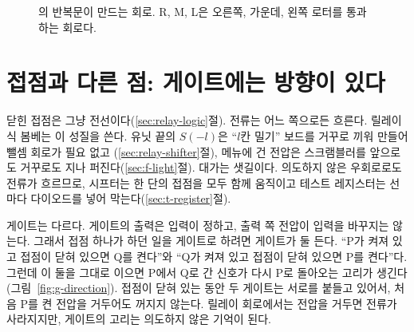 \begin{figure}[ht]
\centering
{}
\caption{의 반복문이 만드는 회로. R, M, L은 오른쪽, 가운데, 왼쪽 로터를 통과하는 회로다.}
\label{fig:g-scr26}
\end{figure}

\section{접점과 다른 점: 게이트에는 방향이 있다}\label{sec:hdl-direction}

\Relay 닫힌 접점은 그냥 전선이다(\ref{sec:relay-logic}절). 전류는 어느 쪽으로든 흐른다. 릴레이식 봄베는 이
성질을 쓴다. 유닛 끝의 $S(-l)$은 ``$l$칸 밀기'' 보드를 거꾸로 끼워 만들어 뺄셈 회로가 필요 없고
(\ref{sec:relay-shifter}절), 메뉴에 건 전압은 스크램블러를 앞으로도 거꾸로도 지나 퍼진다(\ref{sec:f-light}절).
대가는 샛길이다. 의도하지 않은 우회로로도 전류가 흐르므로, 시프터는 한 단의 접점을 모두 함께 움직이고 테스트
레지스터는 선마다 다이오드를 넣어 막는다(\ref{sec:t-register}절).

\Why 게이트는 다르다. 게이트의 출력은 입력이 정하고, 출력 쪽 전압이 입력을 바꾸지는 않는다. 그래서 접점 하나가
하던 일을 게이트로 하려면 게이트가 둘 든다. ``P가 켜져 있고 접점이 닫혀 있으면 Q를 켠다''와 ``Q가 켜져 있고
접점이 닫혀 있으면 P를 켠다''다. 그런데 이 둘을 그대로 이으면 P에서 Q로 간 신호가 다시 P로 돌아오는 고리가
생긴다(그림~\ref{fig:g-direction}). 접점이 닫혀 있는 동안 두 게이트는 서로를 붙들고 있어서, 처음 P를 켠 전압을
거두어도 꺼지지 않는다. 릴레이 회로에서는 전압을 거두면 전류가 사라지지만, 게이트의 고리는 의도하지 않은 기억이
된다.

